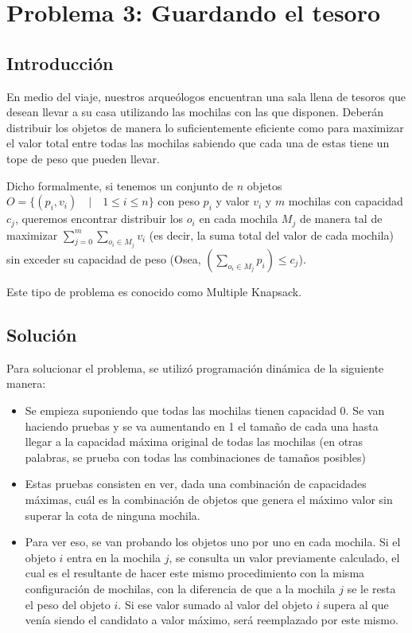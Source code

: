 \section{Problema 3: Guardando el tesoro}

\subsection{Introducción}

En medio del viaje, nuestros arqueólogos encuentran una sala llena de tesoros que desean llevar a su casa utilizando las mochilas con las que disponen. Deberán distribuir los objetos de manera lo suficientemente eficiente como para maximizar el valor total entre todas las mochilas sabiendo que cada una de estas tiene un tope de peso que pueden llevar.

Dicho formalmente, si tenemos un conjunto de $n$ objetos $O = \{(p_i,v_i) \quad | \quad 1 \leq i \leq n\}$ con peso $p_i$ y valor $v_i$ y $m$ mochilas con capacidad $c_j$, queremos encontrar distribuir los $o_i$ en cada mochila $M_j$ de manera tal de maximizar $\sum_{j = 0}^m\sum_{o_i \in M_j} v_i$ (es decir, la suma total del valor de cada mochila) sin exceder su capacidad de peso (Osea, $(\sum_{o_i \in M_j} p_i) \leq c_j$).

Este tipo de problema es conocido como Multiple Knapsack.

\subsection{Solución}

Para solucionar el problema, se utilizó programación dinámica de la siguiente manera:

\begin{itemize}
\item Se empieza suponiendo que todas las mochilas tienen capacidad 0. Se van haciendo pruebas y se va aumentando en 1 el tamaño de cada una hasta llegar a la capacidad máxima original de todas las mochilas (en otras palabras, se prueba con todas las combinaciones de tamaños posibles)
\item Estas pruebas consisten en ver, dada una combinación de capacidades máximas, cuál es la combinación de objetos que genera el máximo valor sin superar la cota de ninguna mochila.
\item Para ver eso, se van probando los objetos uno por uno en cada mochila. Si el objeto $i$ entra en la mochila $j$, se consulta un valor previamente calculado, el cual es el resultante de hacer este mismo procedimiento con la misma configuración de mochilas, con la diferencia de que a la mochila $j$ se le resta el peso del objeto $i$. Si ese valor sumado al valor del objeto $i$ supera al que venía siendo el candidato a valor máximo, será reemplazado por este mismo.
\end{itemize}

